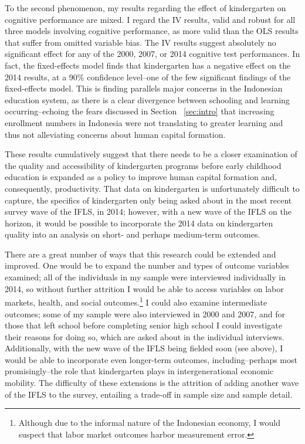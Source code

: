 To the second phenomenon, my results regarding the effect of kindergarten on cognitive performance are mixed. I regard the IV results, valid and robust for all three models involving cognitive performance, as more valid than the OLS results that suffer from omitted variable bias. The IV results suggest absolutely no significant effect for any of the 2000, 2007, or 2014 cognitive test performances. In fact, the fixed-effects model finds that kindergarten has a negative effect on the 2014 results, at a 90\% confidence level--one of the few significant findings of the fixed-effects model. This is finding parallels major concerns in the Indonesian education system, as there is a clear divergence between schooling and learning occurring--echoing the fears discussed in Section ~\ref{sec:intro} that increasing enrollment numbers in Indonesia were not translating to greater learning and thus not alleviating concerns about human capital formation. 

These results cumulatively suggest that there needs to be a closer examination of the quality and accessibility of kindergarten programs before early childhood education is expanded as a policy to improve human capital formation and, consequently, productivity. That data on kindergarten is unfortunately difficult to capture, the specifics of kindergarten only being asked about in the most recent survey wave of the IFLS, in 2014; however, with a new wave of the IFLS on the horizon, it would be possible to incorporate the 2014 data on kindergarten quality into an analysis on short- and perhaps medium-term outcomes.

There are a great number of ways that this research could be extended and improved. One would be to expand the number and types of outcome variables examined; all of the individuals in my sample were interviewed individually in 2014, so without further attrition I would be able to access variables on labor markets, health, and social outcomes.\footnote{Although due to the informal nature of the Indonesian economy, I would suspect that labor market outcomes harbor measurement error.} I could also examine intermediate outcomes; some of my sample were also interviewed in 2000 and 2007, and for those that left school before completing senior high school I could investigate their reasons for doing so, which are asked about in the individual interviews. Additionally, with the new wave of the IFLS being fielded soon (see above), I would be able to incorporate even longer-term outcomes, including--perhaps most promisingly--the role that kindergarten plays in intergenerational economic mobility. The difficulty of these extensions is the attrition of adding another wave of the IFLS to the survey, entailing a trade-off in sample size and sample detail. 